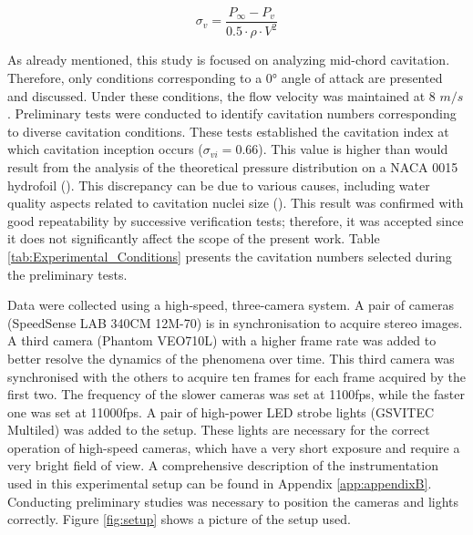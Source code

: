 \begin{equation}
    \label{cavitation_number}
        \sigma_v = \frac{P_\infty - P_v}{0.5 \cdot \rho \cdot V^2}
\end{equation}

As already mentioned, this study is focused on analyzing mid-chord cavitation. Therefore, only conditions corresponding to a 0° angle of attack are presented and discussed. Under these conditions, the flow velocity was maintained at 8 $m/s$.  
Preliminary tests were conducted to identify cavitation numbers corresponding to diverse cavitation conditions. These tests established the cavitation index at which cavitation inception occurs ($\sigma_{vi} = 0.66$). This value is higher than would result from the analysis of the theoretical pressure distribution on a NACA 0015 hydrofoil (\cite{Abbott1945}).
This discrepancy can be due to various causes, including water quality aspects related to cavitation nuclei size (\cite{franc2006fundamentals}). 
This result was confirmed with good repeatability by successive verification tests; therefore, it was accepted since it does not significantly affect the scope of the present work. Table \ref{tab:Experimental_Conditions} presents the cavitation numbers selected during the preliminary tests.

\begin{center}
\end{center}

Data were collected using a high-speed, three-camera system. A pair of cameras (SpeedSense LAB 340CM 12M-70) is in synchronisation to acquire stereo images. A third camera (Phantom VEO710L) with a higher frame rate was added to better resolve the dynamics of the phenomena over time. This third camera was synchronised with the others to acquire ten frames for each frame acquired by the first two. 
The frequency of the slower cameras was set at 1100fps, while the faster one was set at 11000fps.
A pair of high-power LED strobe lights (GSVITEC Multiled) was added to the setup. These lights are necessary for the correct operation of high-speed cameras, which have a very short exposure and require a very bright field of view. A comprehensive description of the instrumentation used in this experimental setup can be found in Appendix \ref{app:appendixB}.
Conducting preliminary studies was necessary to position the cameras and lights correctly. 
Figure \ref{fig:setup} shows a picture of the setup used.


